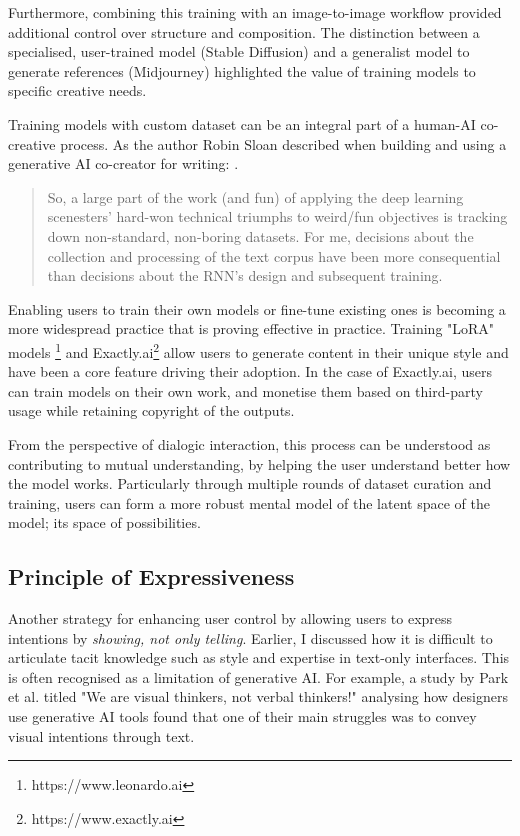 Furthermore, combining this training with an image-to-image workflow provided additional control over structure and composition. The distinction between a specialised, user-trained model (Stable Diffusion) and a generalist model to generate references (Midjourney) highlighted the value of training models to specific creative needs.

Training models with custom dataset can be an integral part of a human-AI co-creative process. As the author Robin Sloan described when building and using a generative AI co-creator for writing: \cite{Sloan2016-fj}. 

\begin{quote}
So, a large part of the work (and fun) of applying the deep learning scenesters' hard-won technical triumphs to weird/fun objectives is tracking down non-standard, non-boring datasets. For me, decisions about the collection and processing of the text corpus have been more consequential than decisions about the RNN's design and subsequent training.
\end{quote}

Enabling users to train their own models or fine-tune existing ones is becoming a more widespread practice that is proving effective in practice. Training "LoRA" models \footnote{https://www.leonardo.ai} and Exactly.ai\footnote{https://www.exactly.ai} allow users to generate content in their unique style and have been a core feature driving their adoption. In the case of Exactly.ai, users can train models on their own work, and monetise them based on third-party usage while retaining copyright of the outputs.

From the perspective of dialogic interaction, this process can be understood as contributing to mutual understanding, by helping the user understand better how the model works. Particularly through multiple rounds of dataset curation and training, users can form a more robust mental model of the latent space of the model; its space of possibilities.

\subsection{Principle of Expressiveness}

Another strategy for enhancing user control by allowing users to express intentions by \textit{showing, not only telling}. Earlier, I discussed how it is difficult to articulate tacit knowledge such as style and expertise in text-only interfaces. This is often recognised as a limitation of generative AI. For example, a study by Park et al. \cite{Park2024-gw} titled "We are visual thinkers, not verbal thinkers!" analysing how designers use generative AI tools found that one of their main struggles was to convey visual intentions through text.

